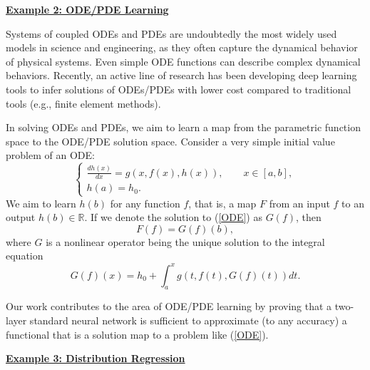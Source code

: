 \documentclass{article}
\def\RR{\mathbb R}
\numberwithin{equation}{section}
\begin{document}
\vspace{3pt}

\noindent \underline{\bf Example 2: ODE/PDE Learning}

\vspace{3pt}

Systems of coupled ODEs and PDEs are undoubtedly the most widely used models in science and engineering, as they often capture the dynamical behavior of physical systems.
Even simple ODE functions can describe complex dynamical behaviors. Recently, an active line of research \citep{raissi2019physics, wang2021learning, li2020fourier} has been developing deep learning tools to infer solutions of ODEs/PDEs with lower cost compared to traditional tools (e.g., finite element methods). 


In solving ODEs and PDEs, we aim to learn a map from the parametric function space to the ODE/PDE solution space. Consider a very simple initial value problem of an ODE: 
\begin{equation}\label{ODE}
    \begin{cases}
        \frac{dh(x)}{dx} = g(x,f(x),h(x)), \qquad x \in [a,b],\\
        h(a) = h_0.
    \end{cases}
\end{equation}
We aim to learn $h(b)$ for any function $f$, that is,  a map $F$ from an input $f$ to an output $h(b)\in \RR$. If we denote the solution to (\ref{ODE}) as $G(f)$, then 
\begin{equation}
   F(f) = G(f)(b),
\end{equation}
where $G$ is a nonlinear operator  being the unique solution to the integral equation
\begin{equation}
    G(f)(x) = h_0 + \int_{a}^x g(t, f(t), G(f)(t))dt.  
\end{equation}

Our work contributes to the area of ODE/PDE learning by proving that a two-layer standard neural network is sufficient to approximate (to any accuracy) a functional that is a solution map to a problem like (\ref{ODE}). 

\vspace{3pt}

\noindent \underline{\bf Example 3: Distribution Regression}

\vspace{3pt}
\end{document}
